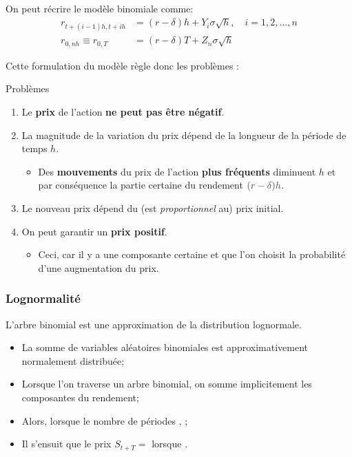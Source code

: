 \documentclass[10pt, french]{article}
\begin{document}
\begin{multicols*}{2}
On peut récrire le modèle binomiale comme:
\begin{align*}
	r_{t + (i - 1)h, t + ih}	
	&=	(r	-	\delta)h	+ Y_{i}\sigma	\sqrt{h}, \quad	i	=	1, 2, \dots, n	\\
	r_{0, nh}
	\equiv	r_{0, T}
	&=	(r	-	\delta)T 	+ Z_{n}\sigma	\sqrt{h}
\end{align*}

Cette formulation du modèle règle donc les problèmes :
\begin{conceptgen}{Problèmes}
\begin{enumerate}[leftmargin = *]
	\item	Le \textbf{prix} de l'action \textbf{ne peut pas être négatif}.
	\item	La magnitude de la variation du prix dépend de la longueur de la période de temps $h$.
		\begin{itemize}
		\item	Des \textbf{mouvements} du prix de l'action \textbf{plus fréquents} diminuent $h$ et par conséquence la partie certaine du rendement ${\color{arsenic}(r	-	\delta)h}$.
		\end{itemize}
	\item	Le nouveau prix dépend du (est \textit{proportionnel} au) prix initial.
	\item	On peut garantir un \textbf{prix positif}. 
		\begin{itemize}[leftmargin = *]
		\item	Ceci, car il y a une composante certaine et que l'on choisit la probabilité d'une augmentation du prix.
		\end{itemize}
\end{enumerate}
\end{conceptgen}

\subsubsection{Lognormalité}

L'arbre binomial est une approximation de la distribution lognormale.
\begin{itemize}
	\item	La somme de variables aléatoires binomiales est approximativement normalement distribuée;
	\item	Lorsque l'on traverse un arbre binomial, on somme implicitement les composantes du rendement;
	\item	Alors, lorsque le nombre de périodes , ;
	\item	Il s'ensuit que le prix $S_{t + T}	=$	 lorsque .
\end{itemize}


\end{multicols*}
\end{document}
